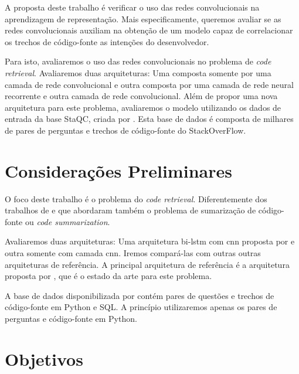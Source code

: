 A proposta deste trabalho é verificar o uso das redes convolucionais na aprendizagem de representação. Mais especificamente, queremos avaliar se as redes convolucionais auxiliam na obtenção de um modelo capaz de correlacionar os trechos de código-fonte as intenções do desenvolvedor.

Para isto, avaliaremos o uso das redes convolucionais no problema de \textit{code retrieval}. Avaliaremos duas arquiteturas: Uma composta somente por uma camada de rede convolucional e outra composta por uma camada de rede neural recorrente e outra camada de rede convolucional. Além de propor uma nova arquitetura para este problema, avaliaremos o modelo utilizando os dados de entrada da base StaQC, criada por \cite{yao-2018}. Esta base de dados é composta de milhares de pares de perguntas e trechos de código-fonte do StackOverFlow.



\section{Considerações Preliminares}
\label{sec:consideracoes_preliminares}

O foco deste trabalho é o problema do \textit{code retrieval}. Diferentemente dos trabalhos de \cite{iyer-etal-2016-summarizing} e \cite{Allamanis-bimodal-source-code-natural-language:2015} que abordaram também o problema de sumarização de código-fonte ou \textit{code summarization}. 

Avaliaremos duas arquiteturas: Uma arquitetura bi-\acrshort{lstm} com \acrshort{cnn} proposta por \cite{tan-lstm-qa} e outra somente com camada \acrshort{cnn}. Iremos compará-las com outras outras arquiteturas de referência. A principal arquitetura de referência é a arquitetura proposta por \cite{cambronero-deep-learning-code-search:2019}, que é o estado da arte para este problema.

A base de dados disponibilizada por \cite{yao-2018} contém pares de questões e trechos de código-fonte em Python e SQL. A princípio utilizaremos apenas os pares de perguntas e código-fonte em Python.


\section{Objetivos}
\label{sec:objetivo}

